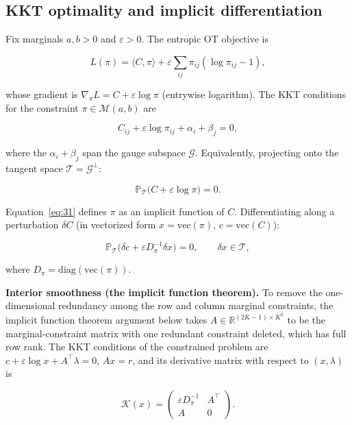 \documentclass[11pt,a4paper]{article}
\theoremstyle{remark}
\begin{document}
\subsection{KKT optimality and implicit differentiation}

Fix marginals $a,b>0$ and $\varepsilon>0$. The entropic OT objective is

\begin{equation}
L(\pi)=\langle C,\pi\rangle+\varepsilon\sum_{ij}\pi_{ij}(\log\pi_{ij}-1),
\end{equation}

whose gradient is $\nabla_\pi L=C+\varepsilon\log\pi$ (entrywise logarithm). The KKT
conditions for the constraint $\pi\in\mathcal{M}(a,b)$ are

\[
C_{ij}+\varepsilon\log\pi_{ij}+\alpha_i+\beta_j=0,
\]

where the $\alpha_i+\beta_j$ span the gauge subspace $\mathcal{G}$. Equivalently,
projecting onto the tangent space $\mathcal{T}=\mathcal{G}^{\perp}$:

\begin{equation}
\boxed{\mathbb{P}_{\mathcal{T}}\bigl(C+\varepsilon\log\pi\bigr)=0}. \label{eq:31}
\end{equation}

Equation~\eqref{eq:31} defines $\pi$ as an implicit function of $C$. Differentiating along
a perturbation $\delta C$ (in vectorized form $x=\mathrm{vec}(\pi)$,
$c=\mathrm{vec}(C)$):

\begin{equation}
\mathbb{P}_{\mathcal{T}}\bigl(\delta c+\varepsilon D_\pi^{-1}\delta x\bigr)=0,\qquad \delta x\in\mathcal{T}, \label{eq:32}
\end{equation}

where $D_\pi=\mathrm{diag}(\mathrm{vec}(\pi))$.

\textbf{Interior smoothness (the implicit function theorem).} To remove the
one-dimensional redundancy among the row and column marginal constraints, the implicit
function theorem argument below takes $A\in\mathbb{R}^{(2K-1)\times K^2}$ to be the
marginal-constraint matrix with one redundant constraint deleted, which has full row rank.
The KKT conditions of the constrained problem are
$c+\varepsilon\log x+A^{\top}\lambda=0$, $Ax=r$, and its derivative matrix with respect to
$(x,\lambda)$ is

\begin{equation}
\mathcal{K}(x)=\begin{pmatrix}\varepsilon D_\pi^{-1} & A^{\top}\\ A & 0\end{pmatrix}.
\end{equation}
\end{document}
